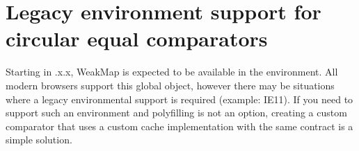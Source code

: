 \chapter{Legacy environment support for circular equal comparators}
\hypertarget{md_node__modules_2fast-equals_2recipes_2legacy-circular-equal-support}{}\label{md_node__modules_2fast-equals_2recipes_2legacy-circular-equal-support}
\label{md_node__modules_2fast-equals_2recipes_2legacy-circular-equal-support_autotoc_md15080}%
%


Starting in {.\+x.\+x}, {\ttfamily Weak\+Map} is expected to be available in the environment. All modern browsers support this global object, however there may be situations where a legacy environmental support is required (example\+: IE11). If you need to support such an environment and polyfilling is not an option, creating a custom comparator that uses a custom cache implementation with the same contract is a simple solution.


